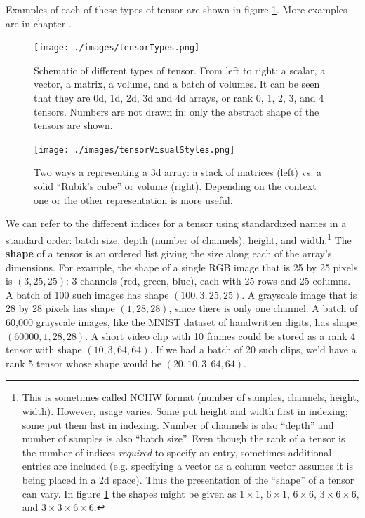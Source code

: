 Examples of each of these types of tensor are shown in figure \ref{tensorTypes}. More examples are in chapter .

\begin{figure}[h]
\centering
\texttt{[image: ./images/tensorTypes.png]}
\caption[Soraya Boza.]{Schematic of different types of tensor. From left to right: a scalar, a vector, a matrix, a volume, and a batch of volumes. It can be seen that they are 0d, 1d, 2d, 3d and 4d arrays, or rank 0, 1, 2, 3, and 4 tensors. Numbers are not drawn in; only the abstract shape of the tensors are shown.} 
\label{tensorTypes}
\end{figure}

\begin{figure}[h]
\centering
\texttt{[image: ./images/tensorVisualStyles.png]}
\caption[Soraya Boza.]{Two ways a representing a 3d array: a stack of matrices (left) vs. a solid ``Rubik's cube''  or volume (right). Depending on the context one or the other representation is more useful.} 
\label{tensorVisualStyles}
\end{figure}

We can refer to the different indices for a tensor using standardized names in a standard order: batch size, depth (number of channels), height, and width.\footnote{This is sometimes called NCHW format (number of samples, channels, height, width). However, usage varies. Some put height and width first in indexing; some put them last in indexing. Number of channels is also ``depth'' and number of samples is also ``batch size''. Even though the rank of a tensor is the number of indices \emph{required} to specify an entry, sometimes additional entries are included (e.g. specifying a vector as a column vector assumes it is being placed in a 2d space). Thus the presentation of the ``shape'' of a tensor can vary. In figure \ref{tensorTypes} the shapes might be given as $1 \times 1$, $6 \times 1$, $6 \times 6$, $3 \times 6 \times 6$, and $3 \times 3 \times 6 \times 6$.} The \textbf{shape} of a tensor is an ordered list giving the size along each of the array's dimensions. For example, the shape of a single RGB image that is 25 by 25 pixels is $(3, 25, 25)$: 3 channels (red, green, blue), each with 25 rows and 25 columns. A batch of 100 such images has shape $(100, 3, 25, 25)$. A grayscale image that is 28 by 28 pixels has shape $(1, 28, 28)$, since there is only one channel. A batch of 60,000 grayscale images, like the MNIST dataset of handwritten digits, has shape $(60000, 1, 28, 28)$. A short video clip with 10 frames could be stored as a rank 4 tensor with shape $(10, 3, 64, 64)$. If we had a batch of 20 such clips, we'd have a rank 5 tensor whose shape would be $(20, 10, 3, 64, 64)$.

